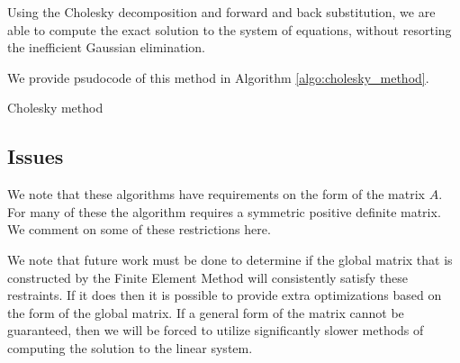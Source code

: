 \documentclass[../fem.tex]{subfiles}
\begin{document}
Using the Cholesky decomposition and forward and back substitution, we are able
to compute the exact solution to the system of equations, without resorting the
inefficient Gaussian elimination.

We provide psudocode of this method in Algorithm \ref{algo:cholesky_method}.

\begin{algorithm}[H]
  \caption{Cholesky method}\label{algo:cholesky_method}
  \begin{algorithmic}
    \State{}
      \EndFor
        \EndFor
      \EndFor
    \EndFor
    \State{}
      \EndFor
    \EndFor
    \State{}
      \EndFor
    \EndFor
  \end{algorithmic}
\end{algorithm}

\subsection{Issues}%
\label{sub:issues}

We note that these algorithms have requirements on the form of the matrix $A$.
For many of these the algorithm requires a symmetric positive definite matrix.
We comment on some of these restrictions here.

We note that future work must be done to determine if the global matrix that is
constructed by the Finite Element Method will consistently satisfy these
restraints. If it does then it is possible to provide extra optimizations based
on the form of the global matrix. If a general form of the matrix cannot be
guaranteed, then we will be forced to utilize significantly slower methods of
computing the solution to the linear system.
\end{document}
